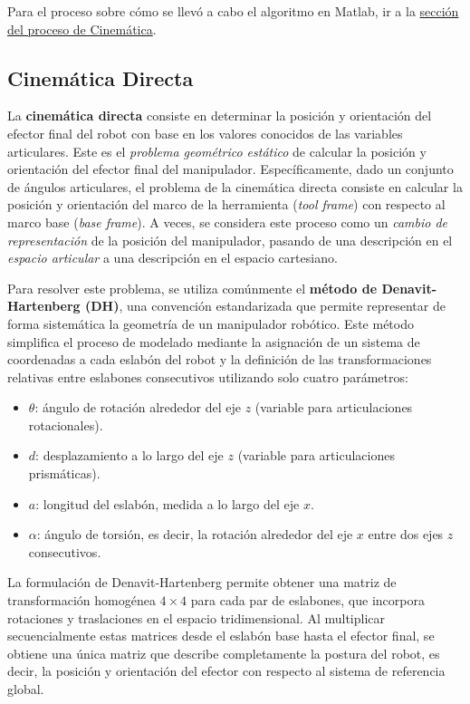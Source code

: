Para el proceso sobre cómo se llevó a cabo el algoritmo en Matlab, ir a la  \hyperref[sec:proceso_cinematica]{sección del proceso de Cinemática}.

\subsection{Cinemática Directa}

La \textbf{cinemática directa} consiste en determinar la posición y orientación del efector final del robot con base en los valores conocidos de las variables articulares. Este es el \textit{problema geométrico estático} de calcular la posición y orientación del efector final del manipulador. Específicamente, dado un conjunto de ángulos articulares, el problema de la cinemática directa consiste en calcular la posición y orientación del marco de la herramienta (\textit{tool frame}) con respecto al marco base (\textit{base frame}). A veces, se considera este proceso como un \textit{cambio de representación} de la posición del manipulador, pasando de una descripción en el \textit{espacio articular} a una descripción en el espacio cartesiano.

Para resolver este problema, se utiliza comúnmente el \textbf{método de Denavit-Hartenberg (DH)}, una convención estandarizada que permite representar de forma sistemática la geometría de un manipulador robótico. Este método simplifica el proceso de modelado mediante la asignación de un sistema de coordenadas a cada eslabón del robot y la definición de las transformaciones relativas entre eslabones consecutivos utilizando solo cuatro parámetros:

\begin{itemize}
	\item $\theta$: ángulo de rotación alrededor del eje $z$ (variable para articulaciones rotacionales).
	\item $d$: desplazamiento a lo largo del eje $z$ (variable para articulaciones prismáticas).
	\item $a$: longitud del eslabón, medida a lo largo del eje $x$.
	\item $\alpha$: ángulo de torsión, es decir, la rotación alrededor del eje $x$ entre dos ejes $z$ consecutivos.
\end{itemize}

La formulación de Denavit-Hartenberg permite obtener una matriz de transformación homogénea $4 \times 4$ para cada par de eslabones, que incorpora rotaciones y traslaciones en el espacio tridimensional. Al multiplicar secuencialmente estas matrices desde el eslabón base hasta el efector final, se obtiene una única matriz que describe completamente la postura del robot, es decir, la posición y orientación del efector con respecto al sistema de referencia global.

